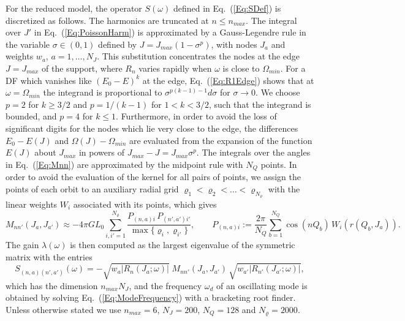 For the reduced model, the operator $S(\omega)$ defined in Eq.~(\ref{Eq:SDef}) is discretized as follows. The harmonics are truncated at $n\leq n_{max}$. The integral over $J'$ in Eq.~(\ref{Eq:PoissonHarm}) is approximated by a Gauss-Legendre rule in the variable $\sigma\in (0,1)$ defined by $J = J_{max}(1 - \sigma^p)$, with nodes $J_a$ and weights $w_a$, $a = 1,\ldots,N_J$. This substitution concentrates the nodes at the edge $J = J_{max}$ of the support, where $R_n$ varies rapidly when $\omega$ is close to $\Omega_{min}$. For a DF which vanishes like $(E_0 - E)^k$ at the edge, Eq.~(\ref{Eq:R1Edge}) shows that at $\omega = \Omega_{min}$ the integrand is proportional to $\sigma^{p(k-1)-1} d\sigma$ for $\sigma\to 0$. We choose $p = 2$ for $k\geq 3/2$ and $p = 1/(k-1)$ for $1 < k < 3/2$, such that the integrand is bounded, and $p = 4$ for $k\leq 1$. Furthermore, in order to avoid the loss of significant digits for the nodes which lie very close to the edge, the differences $E_0 - E(J)$ and $\Omega(J) - \Omega_{min}$ are evaluated from the expansion of the function $E(J)$ about $J_{max}$ in powers of $J_{max} - J = J_{max}\sigma^p$. The integrals over the angles in Eq.~(\ref{Eq:Mnn}) are approximated by the midpoint rule with $N_Q$ points. In order to avoid the evaluation of the kernel for all pairs of points, we assign the points of each orbit to an auxiliary radial grid $\varrho_1 < \varrho_2 < \ldots < \varrho_{N_\varrho}$ with the linear weights $W_i$ associated with its points, which gives
\begin{equation}
M_{nn'}(J_a,J_{a'})\approx -4\pi G L_0\sum\limits_{i,i'=1}^{N_\varrho} \frac{P_{(n,a)i}\, P_{(n',a')i'}}{\max\{ \varrho_i,\varrho_{i'} \}},\qquad
P_{(n,a)i} := \frac{2\pi}{N_Q}\sum\limits_{b=1}^{N_Q} \cos(nQ_b)\, W_i(r(Q_b,J_a)).
\label{Eq:MDiscrete}
\end{equation}
The gain $\lambda(\omega)$ is then computed as the largest eigenvalue of the symmetric matrix with the entries
\begin{equation}
S_{(n,a)(n',a')}(\omega) = -\sqrt{w_a |R_n(J_a;\omega)|}\; M_{nn'}(J_a,J_{a'})\,\sqrt{w_{a'} |R_{n'}(J_{a'};\omega)|},
\label{Eq:SDiscrete}
\end{equation}
which has the dimension $n_{max} N_J$, and the frequency $\omega_d$ of an oscillating mode is obtained by solving Eq.~(\ref{Eq:ModeFrequency}) with a bracketing root finder. Unless otherwise stated we use $n_{max} = 6$, $N_J = 200$, $N_Q = 128$ and $N_\varrho = 2000$.

